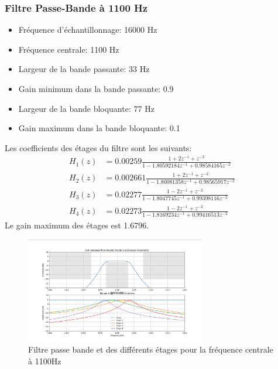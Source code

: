 \subsubsection{Filtre Passe-Bande à 1100 Hz}
\begin{itemize}
    \item Fréquence d'échantillonnage: 16000 Hz
    \item Fréquence centrale: 1100 Hz
    \item Largeur de la bande passante: 33 Hz
    \item Gain minimum dans la bande passante: 0.9
    \item Largeur de la bande bloquante: 77 Hz
    \item Gain maximum dans la bande bloquante: 0.1
\end{itemize}

Les coefficients des étages du filtre sont les suivants:
\begin{align*}
    H_1(z) &= 0.00259 \frac{1+2z^{-1}+z^{-2}}{1-1.80592184z^{-1}+0.98584165z^{-2}} \\
    H_2(z) &= 0.002661 \frac{1+2z^{-1}+z^{-2}}{1-1.80081358z^{-1}+0.98565917z^{-2}} \\
    H_3(z) &= 0.02277 \frac{1-2z^{-1}+z^{-2}}{1-1.8047745z^{-1}+0.99398116z^{-2}} \\
    H_4(z) &= 0.02273 \frac{1-2z^{-1}+z^{-2}}{1-1.8169234z^{-1}+0.99416513z^{-2}}
\end{align*}
Le gain maximum des étages est 1.6796.
\begin{figure}[H]
    \centering
    \includegraphics[width=0.7\textwidth]{Pictures/filtre iir 1100.png}
    \caption{Filtre passe bande et des différents étages pour la fréquence centrale à 1100Hz}
    \label{fig:enter-label}
\end{figure}


